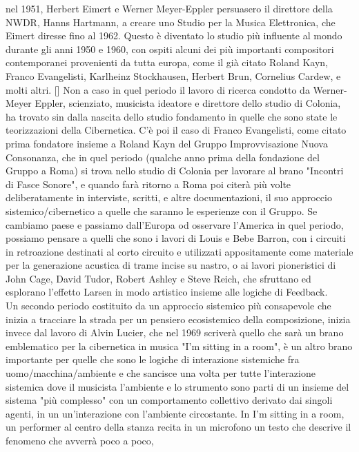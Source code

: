 nel 1951, Herbert Eimert e Werner Meyer-Eppler persuasero il direttore della NWDR, Hanns Hartmann,
a creare uno Studio per la Musica Elettronica, che Eimert diresse fino al 1962.
Questo è diventato lo studio più influente al mondo durante gli anni 1950 e 1960,
con ospiti alcuni dei più importanti compositori contemporanei provenienti da tutta europa,
come il già citato Roland Kayn, Franco Evangelisti, Karlheinz Stockhausen, Herbert Brun,
Cornelius Cardew, e molti altri. [\cite{EMSColonia}]
Non a caso in quel periodo il lavoro di ricerca condotto da Werner-Meyer Eppler,
scienziato, musicista ideatore e direttore dello studio di Colonia,
ha trovato sin dalla nascita dello studio fondamento in quelle che sono state
le teorizzazioni della Cibernetica.
C'è poi il caso di Franco Evangelisti,
come citato prima fondatore insieme a Roland Kayn del Gruppo Improvvisazione Nuova Consonanza,
che in quel periodo (qualche anno prima della fondazione del Gruppo a Roma)
si trova nello studio di Colonia per lavorare al brano "Incontri di Fasce Sonore",
e quando farà ritorno a Roma poi citerà più volte deliberatamente in interviste, scritti,
e altre documentazioni, il suo approccio sistemico/cibernetico a quelle che saranno le esperienze con il Gruppo.
Se cambiamo paese e passiamo dall'Europa od osservare l'America in quel periodo,
possiamo pensare a quelli che sono i lavori di Louis e Bebe Barron,
con i circuiti in retroazione destinati al corto circuito
e utilizzati appositamente come materiale per la generazione acustica di trame incise su nastro,
o ai lavori pioneristici di
John Cage, David Tudor, Robert Ashley e Steve Reich,
che sfruttano ed esplorano l'effetto Larsen in modo artistico insieme
alle logiche di Feedback. \\
Un secondo periodo costituito da un approccio sistemico più consapevole
che inizia a tracciare la strada per un pensiero ecosistemico della composizione,
inizia invece dal lavoro
di Alvin Lucier, che nel 1969 scriverà quello che sarà un brano emblematico per
la cibernetica in musica "I'm sitting in a room",
è un altro brano importante per quelle che sono
le logiche di interazione sistemiche fra uomo/macchina/ambiente
e che sancisce una volta per tutte
l'interazione sistemica dove il musicista l'ambiente e lo strumento sono parti di un insieme del sistema "più complesso" con un comportamento collettivo derivato dai singoli agenti,
in un un'interazione con l'ambiente circostante.
In I'm sitting in a room, un performer al centro della stanza
recita in un microfono un testo che descrive il fenomeno che avverrà poco a poco,
